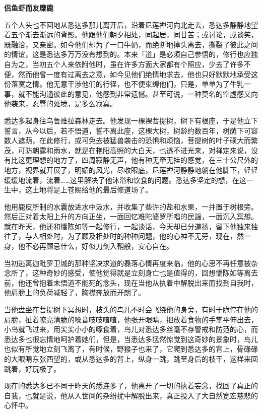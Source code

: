 \documentclass[12pt,twoside,openany]{book}
\newcommand{\mt}[1]{\textbullet \textbf{#1}}
\begin{document}
\mt{侣鱼虾而友糜鹿}

五个人头也不回地从悉达多那儿离开后，沿着尼莲禅河向北走去，悉达多静静地望着五个渐去渐远的背影。他跟他们朝夕相处，同起居，同甘苦；或讨论，或谈笑，既融洽，又亲密。如今他们却为了一口牛奶，而绝断地掉头离去，撕裂了彼此之间的情谊，这是悉达多万万没有想到的。本来「道」是必须自己参悟的，修行也应独自为之，当初五个人来依附他时，虽在许多方面大家都有个照应，少去了许多不便，然而他曾一度有过离去之意，如今见他们绝情地求去，他也只好默默地承受这份落寞之情。他无意干涉他们的行径，也不便束缚他们，只是，单单为了牛乳一事，就不能沟通彼此的意见，他感到非常遗憾。甚至可说，一种莫名的空虚感又向他袭来，忍辱的处境，是多么寂寞。

悉达多起身往乌鲁维拉森林走去。他发现一棵裸菩提树，树下有根座，于是他立下誓言，从今以后，若不悟道，誓不离此座，这棵大树，树龄约数百年，树荫下可容数人遮荫，在此修行，或可免去被猛兽袭击的恐惧和烦恼，菩提树的叶子硕大而繁茂，可防朝露和雨水，就是在艳阳高照的大白天，也透不进光来，对禅定来说，没有比这更理想的地方了，四周寂静无声，他有种无牵无挂的感觉，在三十公尺外的地方，视界就开展了，明媚的风光，尽收眼底，尼莲禅河静静地躺在他脚下，轻轻缓缓地流着，流着……这里解决了他沐浴和饮食的问题。悉达多坚定的想，在这一生中，这土地将是上苍赐给他的最后修道场了。

他用鹿皮所制的水囊放进水中汲水，并收集了些许的盐和水果，一并置于树根旁。然后正对着太阳上升的方向正坐，一面回忆难陀婆罗所唱的民謡，一面沉入冥想。就在昨天，他还和憍陈如等一起修行，一起谈话，今天却已分道扬，留下他独来独往了，与人相处时，为了顾及相处时的种种问题，他的心神不无旁，现在，然一身，他不必再顾忌什么，好似刀剑入鞘般，安心自在。

当初逃离迦毗罗卫城的那种坚决求道的磊落心情再度来临，他的心思不再任意被杂念所了，这种奇妙的感受，使他觉得就是立刻身亡也是值得的，回想憍陈如等离去前，他还曾抱着未悟道不能死的念头，现在当他从执着中解脱出来而找到自我时，他肩膀上的负荷减轻了，胸襟奔放而开朗了。

当他盘坐在菩提树下冥想时，枝头的鸟儿不时会飞绕他的身旁，有时干脆停在他的肩膀，扯着嘹亮清脆的嗓音吱吱喳喳，他张开眼睛，把放着食物的手掌平伸出去，小鸟就飞过来，用尖尖小小的啄食着，鸟儿对悉达多丝毫不存警戒和防范的心，而悉达多也很忘情地呵护着她们，但是，当悉达多猛然惊觉到这奇妙的景象时，鸟儿也似有所觉地立刻飞离了，有时候，野猴子也来了，它爬到悉达多的背上，骨碌碌的大眼睛东张西望的，或从悉达多的背上，纵身一跳，跳至身后的枝干，这样来回跳着，好玩极了。

现在的悉达多已不同于昨天的悉连多了，他离开了一切的执着妄念，找回了真正的自我，也就是说，他从人世间的杂纷扰中解脱出来，真正投入了大自然宽宏慈悲的心怀中。
\end{document}
